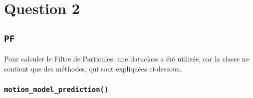 \documentclass[../CSC_5RO12_TA_TP3.tex]{subfiles}
\begin{document}
\section{Question 2}
\subsection{\texttt{PF}}
\noindent Pour calculer le Filtre de Particules, une dataclass a été utilisée, car la classe ne contient que des méthodes, qui sont expliquées ci-dessous.

\subsubsection{\texttt{motion\_model\_prediction()}}
\end{document}
